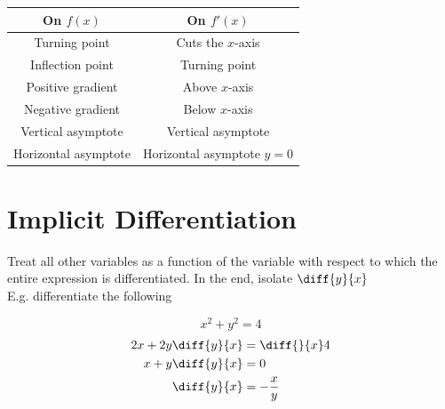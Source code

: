 \documentclass[11pt]{article}
\newcommand{\lb}{\\[8pt]}
\begin{document}
\bgroup
\def\arraystretch{1.5}%
\begin{center}
  \begin{tabular}{c|c}
    On $f(x)$            & On $f'(x)$                   \\
    \hline
    Turning point        & Cuts the $x$-axis            \\ \hline
    Inflection point     & Turning point                \\ \hline
    Positive gradient    & Above $x$-axis               \\ \hline
    Negative gradient    & Below $x$-axis               \\ \hline
    Vertical asymptote   & Vertical asymptote           \\ \hline
    Horizontal asymptote & Horizontal asymptote $y = 0$ \\ \hline
  \end{tabular}
\end{center}
\egroup

\pagebreak

\section{Implicit Differentiation}

Treat all other variables as a function of the variable with respect to which the entire expression is differentiated. In the end, isolate $\diff{y}{x}$\lb
E.g. differentiate the following

$$x^2 + y^2 = 4$$
\begin{align*}
  2x + 2y\diff{y}{x} & = \diff{}{x}4  \\
  x + y\diff{y}{x}   & = 0            \\
  \diff{y}{x}        & = -\frac{x}{y} \\
\end{align*}
\end{document}

